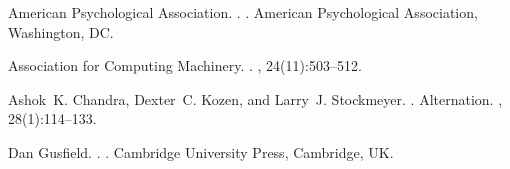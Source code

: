 \documentclass[11pt]{article}
\begin{document}
\begin{CJK*}{UTF8}{gbsn}
\begin{thebibliography}{}
{American Psychological Association}.
.
.
\newblock American Psychological Association, Washington, DC.

{Association for Computing Machinery}.
.
, 24(11):503--512.

Ashok~K. Chandra, Dexter~C. Kozen, and Larry~J. Stockmeyer.
.
\newblock Alternation.
,
  28(1):114--133.

Dan Gusfield.
.
.
\newblock Cambridge University Press, Cambridge, UK.

\end{thebibliography}

\end{CJK*}
\end{document}
